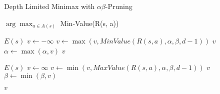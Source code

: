 \begin{algorithm}[H]
    \caption{Depth Limited Minimax with $\alpha\beta$-Pruning}
    \label{alg:alphabeta}
    \begin{algorithmic}[1]
    
        \State \Return $\arg\max_{a \in A(s)}$ Min-Value(R(s, a))
    \EndProcedure
    \end{algorithmic}

    \begin{algorithmic}[1]

            \Return $E(s)$
        \EndIf
        \State $v \leftarrow -\infty$
            \State $v \leftarrow \max(v, MinValue(R(s, a), \alpha, \beta, d-1))$
                \Return $v$
            \EndIf
            \State $\alpha \leftarrow \max(\alpha, v)$
        \EndFor
        \State \Return $v$
    \EndProcedure
    
    \end{algorithmic}
        
    \begin{algorithmic}[1]

            \Return $E(s)$
        \EndIf
        \State $v \leftarrow \infty$
            \State $v \leftarrow \min(v, MaxValue(R(s, a), \alpha, \beta, d-1))$
                \Return $v$
            \EndIf
            \State $\beta \leftarrow \min(\beta, v)$
        \EndFor

        \State \Return $v$
    \EndProcedure

    \end{algorithmic}
\end{algorithm}